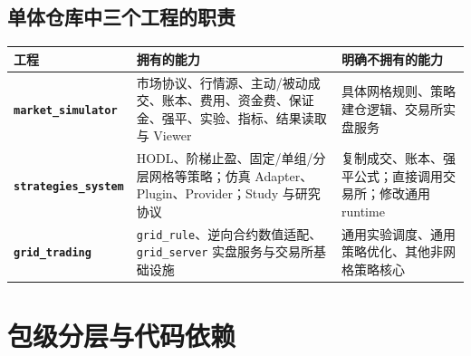 \documentclass[UTF8,fontset=fandol,11pt,a4paper]{ctexart}
\newcommand{\code}[1]{\nolinkurl{#1}}
\begin{document}
\subsection{单体仓库中三个工程的职责}

\noindent\begin{tabularx}{\textwidth}{>{\bfseries}p{31mm} X X}
\toprule
工程 & 拥有的能力 & 明确不拥有的能力 \\
\midrule
\code{market_simulator} &
市场协议、行情源、主动/被动成交、账本、费用、资金费、保证金、强平、实验、指标、结果读取与 Viewer &
具体网格规则、策略建仓逻辑、交易所实盘服务 \\
\code{strategies_system} &
HODL、阶梯止盈、固定/单组/分层网格等策略；仿真 Adapter、Plugin、Provider；Study 与研究协议 &
复制成交、账本、强平公式；直接调用交易所；修改通用 runtime \\
\code{grid_trading} &
\code{grid_rule}、逆向合约数值适配、\code{grid_server} 实盘服务与交易所基础设施 &
通用实验调度、通用策略优化、其他非网格策略核心 \\
\bottomrule
\end{tabularx}

\section{包级分层与代码依赖}
\end{document}

